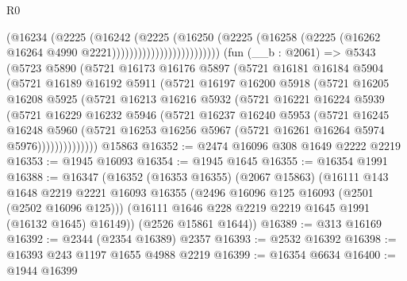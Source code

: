 \begin{lexlean}{R0}
\begin{coremodule}
                                    (@16234
                                      (@2225
                                        (@16242
                                          (@2225
                                            (@16250
                                              (@2225
                                                (@16258
                                                  (@2225
                                                    (@16262
                                                      @16264
                                                      @4990
                                                      @2221)))))))))))))))))))))))))
    (fun (__b : @2061) =>
    @5343
      (@5723
        @5890
        (@5721
          @16173
          @16176
          @5897
          (@5721
            @16181
            @16184
            @5904
            (@5721
              @16189
              @16192
              @5911
              (@5721
                @16197
                @16200
                @5918
                (@5721
                  @16205
                  @16208
                  @5925
                  (@5721
                    @16213
                    @16216
                    @5932
                    (@5721
                      @16221
                      @16224
                      @5939
                      (@5721
                        @16229
                        @16232
                        @5946
                        (@5721
                          @16237
                          @16240
                          @5953
                          (@5721
                            @16245
                            @16248
                            @5960
                            (@5721
                              @16253
                              @16256
                              @5967
                              (@5721 @16261 @16264 @5974 @5976))))))))))))))
    @15863
@16352 := @2474 @16096 @308 @1649 @2222 @2219
@16353 := @1945 @16093
@16354 := @1945 @1645
@16355 := @16354 @1991
@16388 := @16347
    (@16352
      (@16353 @16355)
      (@2067 @15863)
      (@16111
        @143
        @1648
        @2219
        @2221
        @16093
        @16355
        (@2496 @16096 @125 @16093 (@2501 (@2502 @16096 @125)))
        (@16111 @1646 @228 @2219 @2219 @1645 @1991 (@16132 @1645) @16149))
      (@2526 @15861 @1644))
@16389 := @313 @16169
@16392 := @2344 (@2354 @16389) @2357
@16393 := @2532 @16392
@16398 := @16393 @243 @1197 @1655 @4988 @2219
@16399 := @16354 @6634
@16400 := @1944 @16399

\end{coremodule}
\end{lexlean}
